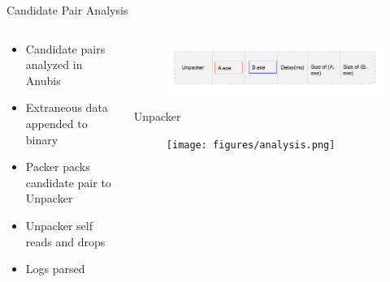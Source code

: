 \documentclass{beamer}
\begin{document}
\begin{frame}[plain]{Candidate Pair Analysis}
  \begin{columns}
    \begin{column}{5cm}
    \begin{itemize}
      \item Candidate pairs analyzed in Anubis
      \item Extraneous data appended to binary
      \item Packer packs candidate pair to Unpacker
      \item Unpacker self reads and drops
      \item Logs parsed
    \end{itemize}
    \end{column}
    \begin{column}{5cm}
      \begin{figure}[H]
        \centering
        \includegraphics[scale=0.26]{figures/unpacker.png}
      \label{fig:unpacker}
      \end{figure}
      \tiny \centering Unpacker
      \begin{figure}[h]
        \centering
        \texttt{[image: figures/analysis.png]}
      \end{figure}
    \end{column}
  \end{columns}
\end{frame}
\end{document}

